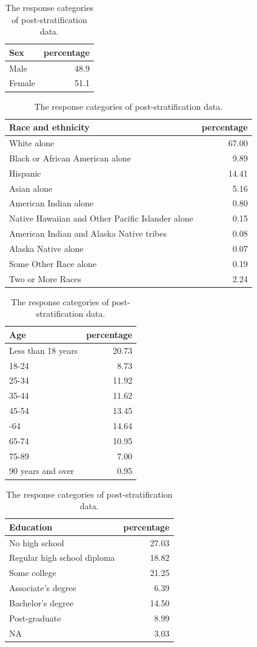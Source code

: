 \documentclass{monashthesis}
\begin{document}
\begin{table}
\caption{\label{tab:acs-response-freq}The response categories of post-stratification data.}

\centering
\begin{tabular}[t]{lr}
\toprule
Sex & percentage\\
\midrule
Male & 48.9\\
Female & 51.1\\
\bottomrule
\end{tabular}
\centering
\begin{tabular}[t]{lr}
\toprule
Race and ethnicity & percentage\\
\midrule
White alone & 67.00\\
Black or African American alone & 9.89\\
Hispanic & 14.41\\
Asian alone & 5.16\\
American Indian alone & 0.80\\
\addlinespace
Native Hawaiian and Other Pacific Islander alone & 0.15\\
American Indian and Alaska Native tribes & 0.08\\
Alaska Native alone & 0.07\\
Some Other Race alone & 0.19\\
Two or More Races & 2.24\\
\bottomrule
\end{tabular}
\centering
\begin{tabular}[t]{lr}
\toprule
Age & percentage\\
\midrule
Less than 18 years & 20.73\\
18-24 & 8.73\\
25-34 & 11.92\\
35-44 & 11.62\\
45-54 & 13.45\\
\addlinespace
55-64 & 14.64\\
65-74 & 10.95\\
75-89 & 7.00\\
90 years and over & 0.95\\
\bottomrule
\end{tabular}
\centering
\begin{tabular}[t]{lr}
\toprule
Education & percentage\\
\midrule
No high school & 27.03\\
Regular high school diploma & 18.82\\
Some college & 21.25\\
Associate's degree & 6.39\\
Bachelor's degree & 14.50\\
\addlinespace
Post-graduate & 8.99\\
NA & 3.03\\
\bottomrule
\end{tabular}
\end{table}
\end{document}
